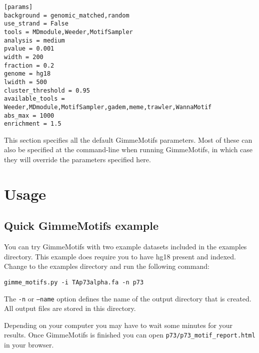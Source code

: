 \documentclass[10pt]{article}
\begin{document}
\begin{verbatim}
[params]
background = genomic_matched,random
use_strand = False
tools = MDmodule,Weeder,MotifSampler
analysis = medium
pvalue = 0.001
width = 200
fraction = 0.2
genome = hg18
lwidth = 500
cluster_threshold = 0.95
available_tools = Weeder,MDmodule,MotifSampler,gadem,meme,trawler,WannaMotif
abs_max = 1000
enrichment = 1.5
\end{verbatim}
This section specifies all the default GimmeMotifs parameters. Most of these can also be specified at the command-line when running GimmeMotifs, in which case they will override the parameters specified here.

\section{Usage}
\subsection{Quick GimmeMotifs example}
You can try GimmeMotifs with two example datasets included in the examples directory. This example does require you to have hg18 present and indexed. 
Change to the examples directory and run the following command:
\begin{verbatim}
gimme_motifs.py -i TAp73alpha.fa -n p73
\end{verbatim}

The \texttt{-n} or \texttt{--name} option defines the name of the output directory that is created. All output files are stored in this directory.

Depending on your computer you may have to wait some minutes for your results. Once GimmeMotifs is finished you can open \texttt{p73{\slash}p73\_motif\_report.html} in your browser. 
\end{document}
